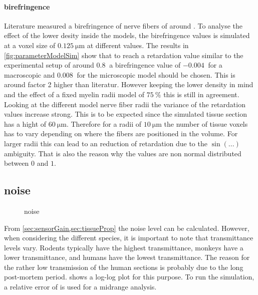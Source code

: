 \paragraph{birefringence}
% 
Literature measured a birefringence of nerve fibers of around \dummy{}. 
To analyse the effect of the lower desity inside the models, the birefringence values is simulated at a voxel size of $\SI{0.125}{\micro\meter}$ at different values.
The results in \cref{fig:parameterModelSim} show that to reach a retardation value similar to the experimental setup of around $\SI{0.8}{}$ a birefringence value of $\SI{-0.004}{}$ for a macroscopic and $\SI{0.008}{}$ for the microscopic model should be chosen.
This is around factor 2  higher than literatur.
However keeping the lower density in mind and the effect of a fixed myelin radii model of $\SI{75}{\percent}$ this is still in agreement.
Looking at the different model nerve fiber radii the variance of the retardation values increase strong.
This is to be expected since the simulated tissue section has a hight of $\SI{60}{\micro\meter}$.
Therefore for a radii of $\SI{10}{\micro\meter}$ the number of tissue voxels has to vary depending on where the fibers are positioned in the volume.
For larger radii this can lead to an reduction of retardation due to the $\sin(...)$ ambiguity.
That is also the reason why the values are non normal distributed between $\si{0}$ and $\si{1}$.
%  
% 
% 
\subsection{noise}
% 
\begin{figure}[!t]
\centering
{}
\caption[noise plot]{noise \dummy{}}
\label{fig:noiseplot}
\end{figure}
% 
From \cref{sec:sensorGain,sec:tissueProp} the noise level can be calculated.
However, when considering the different species, it is important to note that transmittance levels vary.
Rodents typically have the highest transmittance, monkeys have a lower transmittance, and humans have the lowest transmittance.
The reason for the rather low transmission of the human sections is probably due to the long post-mortem period.
 shows a log-log plot for this purpose.
To run the simulation, a relative error of \dummy{} is used for a midrange analysis.
% 
% 
% 
